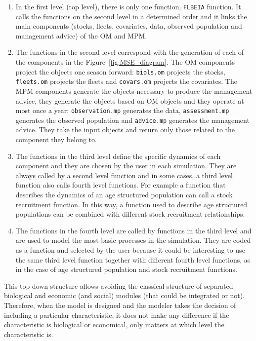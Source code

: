 \begin{enumerate}
	\item In the first level (top level), there is only one function, \texttt{FLBEIA} function. 
	It calls the functions on the second level in a determined order and it links the main components	(stocks, fleets, covariates, data, observed population and management advice) of the OM and MPM.
	
	\item The functions in the second level correspond with the generation of each of the components in the Figure~\ref{fig:MSE_diagram}. The OM components project the objects one season forward: \texttt{biols.om} projects the stocks, \texttt{fleets.om} projects the fleets and \texttt{covars.om} projects the covariates. The MPM components generate the objects necessary to produce the management advice, they generate the objects based on OM objects and they operate at most once a year: \texttt{observation.mp} generates the data, \texttt{assessment.mp} generates the observed population and \texttt{advice.mp} generates the management advice. They take the input objects and return only those related to the component they belong to.
			
	\item The functions in the third level define the specific dynamics of each component 
	and they are chosen by the user in each simulation. They are always called by a second level function and in some cases, a third level function also calls fourth level functions. For example a function that describes the dynamics of an age structured population can call a stock recruitment function. In this way, a function used	to describe age structured populations can be combined with different stock recruitment relationships.  
  
	\item The functions in the fourth level are called by functions in the third level and are used to model the most basic processes in the simulation. They are coded as a function and selected by the user because it could be interesting to use the same third level function together with different fourth level functions, as in the case of age structured population and stock recruitment functions.
	
	 \end{enumerate}
	 
This top down structure allows avoiding the classical structure of separated biological and economic (and social) modules (that could be integrated or not). Therefore, when the model is designed and the modeler takes the decision of including a particular characteristic, it does not make any difference if the characteristic is biological or economical, only matters at which level the characteristic is.

